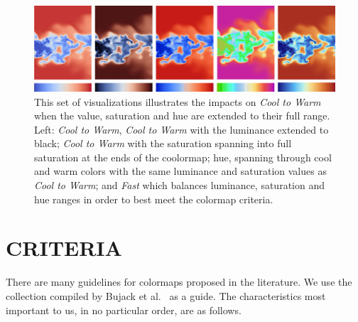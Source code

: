 \documentclass{IEEEcsmag}
\newcommand*{\colormap}[1]{\textsl{#1}\xspace}
\newcommand*{\coolwarm}{\colormap{Cool to Warm}}
\newcommand*{\fast}{\colormap{Fast}}
\begin{document}
\begin{figure}[b]
\centering
\includegraphics[width=\textwidth]{HSVV}
\caption{This set of visualizations illustrates the impacts on \coolwarm when the value, saturation and hue are extended to their full range. Left: \coolwarm, \coolwarm with the luminance extended to black; \coolwarm with the saturation spanning into full saturation at the ends of the coolormap; hue, spanning through cool and warm colors with the same luminance and saturation values as \coolwarm; and \fast which balances luminance, saturation and hue ranges in order to best meet the colormap criteria.}

\label{fig:contrast}
\end{figure}

\section{CRITERIA}

There are many guidelines for colormaps proposed in the literature. We use the collection compiled by Bujack et al.~\cite{Bujack2018} as a guide. The characteristics most important to us, in no particular order, are as follows.
\end{document}
